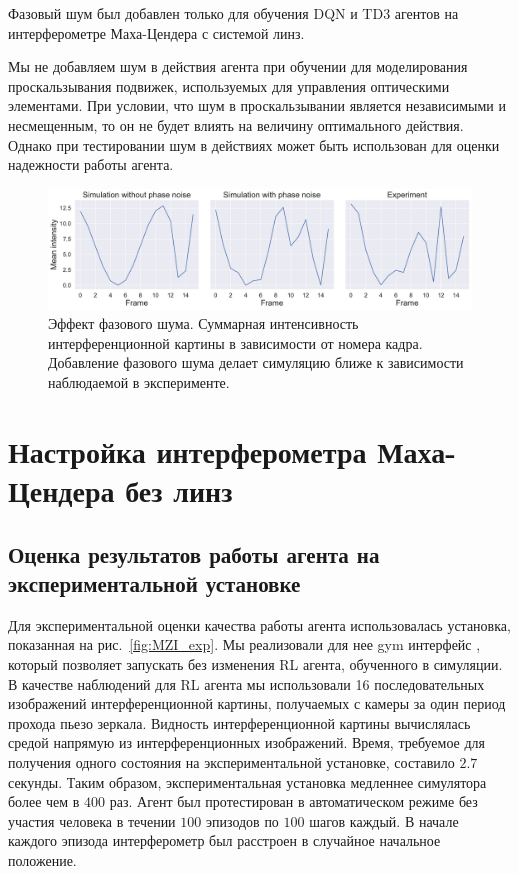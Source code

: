 Фазовый шум был добавлен только для обучения DQN и TD3 агентов на интерферометре Маха-Цендера с системой линз.

Мы не добавляем шум в действия агента при обучении для моделирования проскальзывания подвижек, используемых для управления оптическими элементами. При условии, что шум в проскальзывании является независимыми и несмещенным, то он не будет влиять на величину оптимального действия. 
Однако при тестировании шум в действиях может быть использован для оценки надежности работы агента.


\begin{figure}
  \includegraphics[width=1\linewidth]{images/Piezo_noise.pdf}
  \centering
  \caption{Эффект фазового шума. Суммарная интенсивность интерференционной картины в зависимости от номера кадра. Добавление фазового шума делает симуляцию ближе к зависимости наблюдаемой в эксперименте.}
  \label{fig:piezo_noise}
\end{figure}


\section{Настройка интерферометра Маха-Цендера без линз}

\subsection{Оценка результатов работы агента на экспериментальной установке}
Для экспериментальной оценки качества работы агента использовалась установка, показанная на рис.~\ref{fig:MZI_exp}. Мы реализовали для нее gym интерфейс \cite{brockman2016openai}, который позволяет запускать без изменения RL агента, обученного в симуляции. В качестве наблюдений для RL агента мы использовали 16 последовательных изображений интерференционной картины, получаемых с камеры за один период прохода пьезо зеркала. Видность интерференционной картины вычислялась средой напрямую из интерференционных изображений. Время, требуемое для получения одного состояния на экспериментальной установке, составило $2.7$ секунды. Таким образом, экспериментальная установка медленнее симулятора более чем в $400$ раз. Агент был протестирован в автоматическом режиме без участия человека в течении $100$ эпизодов по $100$ шагов каждый. В начале каждого эпизода интерферометр был расстроен в случайное начальное положение. 

